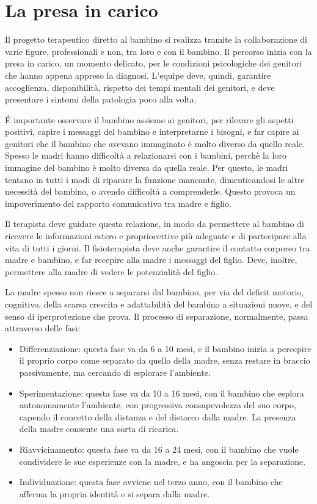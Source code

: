 \chapter{La presa in carico}
Il progetto terapeutico diretto al bambino si realizza tramite la collaborazione di varie figure, professionali e non, tra loro e con il
bambino.
Il percorso inizia con la presa in carico, un momento delicato, per le condizioni psicologiche dei genitori che hanno appena appreso la
diagnosi.
L'equipe deve, quindi, garantire accoglienza, disponibilità, rispetto dei tempi mentali dei genitori, e deve presentare i sintomi della
patologia poco alla volta.

\'E importante osservare il bambino assieme ai genitori, per rilevare gli aspetti positivi, capire i messaggi del bambino e
interpretarne i bisogni, e far capire ai genitori che il bambino che avevano immaginato è molto diverso da quello reale.
Spesso le madri hanno difficoltà a relazionarsi con i bambini, perchè la loro immagine del bambino è molto diversa da quella reale. Per
questo, le madri tentano in tutti i modi di riparare la funzione mancante, dimenticandosi le altre necessità del bambino, o avendo
difficoltà a comprenderle. Questo provoca un impoverimento del rapporto comunicativo tra madre e figlio.

Il terapista deve guidare questa relazione, in modo da permettere al bambino di ricevere le informazioni estero e propriocettive più
adeguate e di partecipare alla vita di tutti i giorni. Il fisioterapista deve anche garantire il contatto corporeo tra madre e bambino,
e far recepire alla madre i messaggi del figlio. Deve, inoltre, permettere alla madre di vedere le potenzialità del figlio.

La madre spesso non riesce a separarsi dal bambino, per via del deficit motorio, cognitivo, della scarsa crescita e adattabilità del
bambino a situazioni nuove, e del senso di iperprotezione che prova.
Il processo di separazione, normalmente, passa attraverso delle fasi:
\begin{itemize}
\item Differenziazione: questa fase va da 6 a 10 mesi, e il bambino inizia a percepire il proprio corpo come separato da quello della
madre, senza restare in braccio passivamente, ma cercando di esplorare l'ambiente.
\item Sperimentazione: questa fase va da 10 a 16 mesi, con il bambino che esplora autonomamente l'ambiente, con progressiva
consapevolezza del suo corpo, capendo il concetto della distanza e del distacco dalla madre. La presenza della madre consente una sorta
di ricarica.
\item Riavvicinamento: questa fase va da 16 a 24 mesi, con il bambino che vuole condividere le sue esperienze con la madre, e ha
angoscia per la separazione.
\item Individuazione: questa fase avviene nel terzo anno, con il bambino che afferma la propria identità e si separa dalla madre.
\end{itemize}

